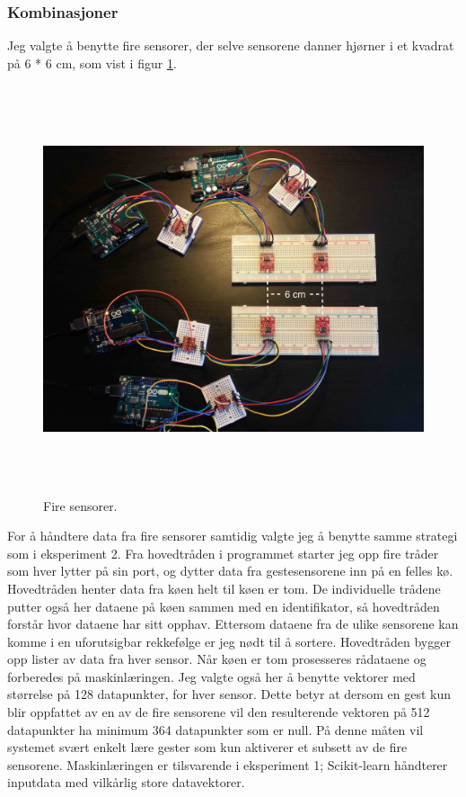 \subsubsection{Kombinasjoner}
Jeg valgte å benytte fire sensorer, der selve sensorene danner hjørner i et kvadrat på 6 * 6 cm, som vist i figur \ref{fig:four-sensors}.
\begin{figure}[h]
\centering
\includegraphics[width=15cm, height=12cm]{fig/foursensors}
\caption{Fire sensorer.}
\label{fig:four-sensors}
\end{figure}
For å håndtere data fra fire sensorer samtidig valgte jeg å benytte samme strategi som i eksperiment 2. Fra hovedtråden i programmet starter jeg opp fire tråder som hver lytter på sin port, og dytter data fra gestesensorene inn på en felles kø. Hovedtråden henter data fra køen helt til køen er tom. De individuelle trådene putter også her dataene på køen sammen med en identifikator, så hovedtråden forstår hvor dataene har sitt opphav. Ettersom dataene fra de ulike sensorene kan komme i en uforutsigbar rekkefølge er jeg nødt til å sortere. Hovedtråden bygger opp lister av data fra hver sensor. Når køen er tom prosesseres rådataene og forberedes på maskinlæringen. Jeg valgte også her å benytte vektorer med størrelse på 128 datapunkter, for hver sensor. Dette betyr at dersom en gest kun blir oppfattet av en av de fire sensorene vil den resulterende vektoren på 512 datapunkter ha minimum 364 datapunkter som er null. På denne måten vil systemet svært enkelt lære gester som kun aktiverer et subsett av de fire sensorene. Maskinlæringen er tilsvarende i eksperiment 1; Scikit-learn håndterer inputdata med vilkårlig store datavektorer.
